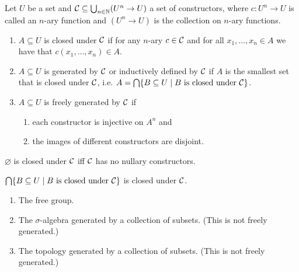 \begin{boxdef}
\begin{defi}
    Let $U$ be a set and $\mathcal{C} \subseteq \bigcup_{n \in \mathbb{N}} (U^n \to U)$ a set of \alert{constructors},
    where $c \colon U^n \to U$ is called an \alert{$n$-ary function} and $(U^n \to U)$ is the collection on $n$-ary functions.
    \begin{enumerate}
        \item $A \subseteq U$ is \alert{closed under $\mathcal{C}$} if for any $n$-ary $c \in \mathcal{C}$ and for all $x_1, \dots , x_n \in A$ we have that $c(x_1, \dots, x_n) \in A$.
        \item $A \subseteq U$ is  \alert{generated by $\mathcal{C}$} or \alert{inductively defined by $\mathcal{C}$} if $A$ is the smallest set that is closed under $\mathcal{C}$, i.e. $A = \bigcap \{B \subseteq U \mid B \text{ is closed under } \mathcal{C}\}$.
        \item $A \subseteq U$ is \alert{freely generated by $\mathcal{C}$} if 
            \begin{enumerate}
                \item each constructor is injective on $A^n$ and
                \item the images of different constructors are disjoint.
            \end{enumerate}
    \end{enumerate}
\end{defi}
\end{boxdef}

\begin{rem}
$\varnothing$ is closed under $\mathcal{C}$ iff $\mathcal{C}$ has no nullary constructors.
\end{rem}

\begin{exercise}
    $\bigcap \{B \subseteq U \mid B \text{\textup{ is closed under }} \mathcal{C}\}$ is closed under $\mathcal{C}$.
\end{exercise}

\begin{example}
    \hfill
    \begin{enumerate}
        \item The free group.
        \item The $\sigma$-algebra generated by a collection of subsets. (This is not freely generated.)
        \item The topology generated by a collection of subsets. (This is not freely generated.)
    \end{enumerate}
\end{example}

